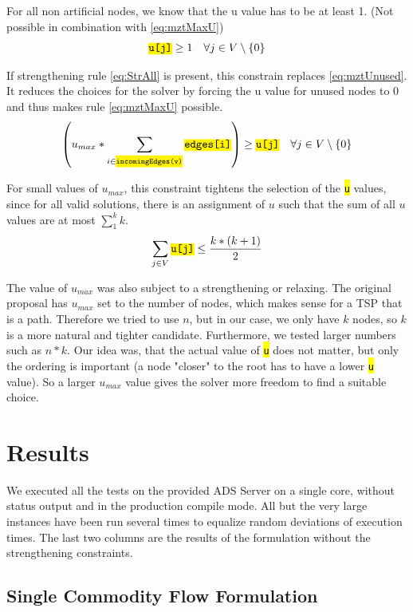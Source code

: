 \documentclass[,%
			paper=a4,%
			DIV14,
			liststotoc,
			bibtotoc,
			draft=false,%
			numbers=noendperiod
			]{scrartcl}
\newcommand{\ilc}[1]{\hl{\texttt{#1}}} %
\newcommand{\vertex}{j}
\begin{document}
For all non artificial nodes, we know that the u value has to be at least 1. (Not possible in combination with \eqref{eq:mztMaxU})
\begin{equation}\label{eq:mztNodes1}
 \ilc{u[\vertex]} \geq 1
 \quad \forall \vertex \in V  \setminus \{0\}
\end{equation}

If strengthening rule \eqref{eq:StrAll} is present, this constrain replaces \eqref{eq:mztUnused}. It reduces the choices for the solver by forcing the u value for unused nodes to 0 and thus makes rule \eqref{eq:mztMaxU} possible.
\begin{equation}\label{eq:mztUnused2}
 \left( u_{max}* \sum_{ i \in \ilc{incomingEdges(v)}} \ilc{edges[i]} \right) \geq \ilc{u[\vertex]}
 \quad \forall \vertex \in V  \setminus \{0\}
\end{equation}

For small values of  $u_{max}$, this constraint tightens the selection of the \ilc{u} values, since for all valid solutions, there is an assignment of $u$ such that the sum of all $u$ values are at most $\sum_1^k{k}$.
\begin{equation}\label{eq:mztMaxU}
	\sum_{\vertex \in V}{\ilc{u[\vertex]}} \leq \frac{k * (k+1)}{2}
\end{equation}

The value of $u_{max}$ was also subject to a strengthening or relaxing. The original proposal has $u_{max}$ set to the number of nodes, which makes sense for a TSP that is a path. Therefore we tried to use $n$, but in our case, we only have $k$ nodes, so $k$ is a more natural and tighter candidate. Furthermore, we tested larger numbers such as $n*k$. Our idea was, that the actual value of \ilc{u} does not matter, but only the ordering is important (a node "closer" to the root has to have a lower \ilc{u} value). So a larger $u_{max}$ value gives the solver more freedom to find a suitable choice.

\section{Results}
We executed all the tests on the provided ADS Server on a single core, without status output and in the production compile mode. All but the very large instances have been run several times to equalize random deviations of execution times. The last two columns are the results of the formulation without the strengthening constraints.


\subsection{Single Commodity Flow Formulation}
\end{document}
